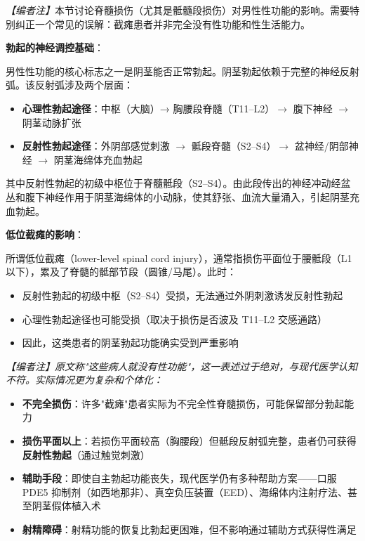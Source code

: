 \noindent\textit{【编者注】}本节讨论脊髓损伤（尤其是骶髓段损伤）对男性性功能的影响。需要特别纠正一个常见的误解：截瘫患者并非完全没有性功能和性生活能力。

\vspace{0.5em}
\noindent\textbf{勃起的神经调控基础}：

男性性功能的核心标志之一是阴茎能否正常勃起。阴茎勃起依赖于完整的神经反射弧。该反射弧涉及两个层面：
\begin{itemize}
	\item \textbf{心理性勃起途径}：中枢（大脑）→ 胸腰段脊髓（T11--L2）$\rightarrow$ 腹下神经 $\rightarrow$ 阴茎动脉扩张
	\item \textbf{反射性勃起途径}：外阴部感觉刺激 $\rightarrow$ 骶段脊髓（S2--S4）$\rightarrow$ 盆神经/阴部神经 $\rightarrow$ 阴茎海绵体充血勃起
\end{itemize}

其中反射性勃起的初级中枢位于脊髓骶段（S2--S4）。由此段传出的神经冲动经盆丛和腹下神经作用于阴茎海绵体的小动脉，使其舒张、血流大量涌入，引起阴茎充血勃起。

\vspace{0.5em}
\noindent\textbf{低位截瘫的影响}：

所谓低位截瘫（lower-level spinal cord injury），通常指损伤平面位于腰骶段（L1以下），累及了脊髓的骶部节段（圆锥/马尾）。此时：
\begin{itemize}
	\item 反射性勃起的初级中枢（S2--S4）受损，无法通过外阴刺激诱发反射性勃起
	\item 心理性勃起途径也可能受损（取决于损伤是否波及 T11--L2 交感通路）
	\item 因此，这类患者的阴茎勃起功能确实受到严重影响
\end{itemize}

\noindent\textit{【编者注】原文称"这些病人就没有性功能"，这一表述过于绝对，与现代医学认知不符。实际情况更为复杂和个体化：}

\begin{itemize}
	\item \textbf{不完全损伤}：许多"截瘫"患者实际为不完全性脊髓损伤，可能保留部分勃起能力
	\item \textbf{损伤平面以上}：若损伤平面较高（胸腰段）但骶段反射弧完整，患者仍可获得\textbf{反射性勃起}（通过触觉刺激）
	\item \textbf{辅助手段}：即使自主勃起功能丧失，现代医学仍有多种帮助方案——口服 PDE5 抑制剂（如西地那非）、真空负压装置（EED）、海绵体内注射疗法、甚至阴茎假体植入术
	\item \textbf{射精障碍}：射精功能的恢复比勃起更困难，但不影响通过辅助方式获得性满足
\end{itemize}

